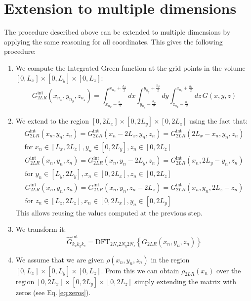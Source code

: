 \section{Extension to multiple dimensions}

The procedure described above can be extended to multiple dimensions by applying the same reasoning for all coordinates. 
This gives the following procedure:
\begin{enumerate}
\item We compute the Integrated Green function at the grid points in the volume $[0, L_x]\times[0, L_y]\times[0, L_z]$:
\begin{equation}
G_{2LR}^\text{int}(x_{n_x}, y_{n_y}, z_{n_z}) = 
\int_{x_{n_x}-\frac{h_x}{2}}^{x_{n_x}+\frac{h_x}{2}} dx
\int_{y_{n_y}-\frac{h_y}{2}}^{y_{n_y}+\frac{h_y}{2}} dy
\int_{z_{n_z}-\frac{h_z}{2}}^{z_{n_z}+\frac{h_z}{2}} dz\,
G(x,y,z)
\end{equation}
\item We extend to the region $[0, 2L_x]\times[0, 2L_y]\times[0, 2L_z]$ using the fact that:
\begin{multline}
G^\text{int}_{2LR}(x_n, y_n, z_n) = G^\text{int}_{2LR}(x_n-2L_x, y_n, z_n) =  G^\text{int}_{2LR}(2L_x-x_n, y_n, z_n)\\
\text{for } x_n \in [L_x, 2L_x], y_n \in [0, 2L_y], z_n \in [0, 2L_z]
\end{multline}
\begin{multline}
G^\text{int}_{2LR}(x_n, y_n, z_n) = G^\text{int}_{2LR}(x_n, y_n-2L_y, z_n) =  G^\text{int}_{2LR}(x_n, 2L_y-y_n,  z_n)\\
\text{for } y_n \in [L_y, 2L_y], x_n \in [0, 2L_x], z_n \in [0, 2L_z]
\end{multline}
\begin{multline}
G^\text{int}_{2LR}(x_n, y_n, z_n) = G^\text{int}_{2LR}(x_n, y_n, z_n-2L_z) =  G^\text{int}_{2LR}(x_n, y_n,  2L_z-z_n)\\
\text{for } z_n \in [L_z, 2L_z], x_n \in [0, 2L_x], y_n \in [0, 2L_y]
\end{multline}
This allows reusing the values computed at the previous step.
\item We transform it:
\begin{equation}
\hat{G}^\text{int}_{k_x k_y k_z} = 
\text{DFT}_{2N_x 2N_y 2N_z}\left\{ G_{2LR}(x_n, y_n, z_n)\right\}
\end{equation}
\item We assume that we are given $\rho(x_n, y_n, z_n)$ in the region $[0, L_x]\times[0, L_y]\times[0, L_z]$. From this we can obtain $\rho_{2LR}(x_n)$ over the region $[0, 2L_x]\times[0, 2L_y]\times[0, 2L_z]$ simply extending the matrix with zeros (see Eq.\,\eqref{eq:zeros}).

\end{enumerate}
